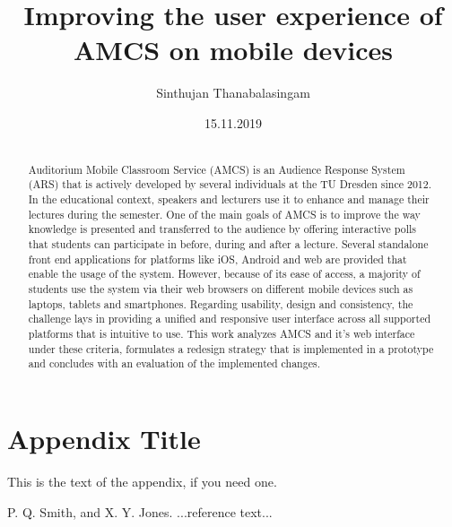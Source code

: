 \documentclass[ngerman]{tudscrreprt}
\begin{document}
	\date{15.11.2019}
	\author{Sinthujan Thanabalasingam}
	\title{Improving the user experience of AMCS on mobile devices}
	\maketitle
	
\begin{abstract}
\section*{\abstractname}
Auditorium Mobile Classroom Service (AMCS) is an Audience Response System (ARS) that is actively developed by several individuals at the TU Dresden since 2012. In the educational context, speakers and lecturers use it to enhance and manage their lectures during the semester. One of the main goals of AMCS is to improve the way knowledge is presented and transferred to the audience by offering interactive polls that students can participate in before, during and after a lecture.
Several standalone front end applications for platforms like iOS, Android and web are provided that enable the usage of the system. However, because of its ease of access, a majority of students use the system via their web browsers on different mobile devices such as laptops, tablets and smartphones. 
Regarding usability, design and consistency, the challenge lays in providing a unified and responsive user interface across all supported platforms that is intuitive to use. This work analyzes AMCS and it's web interface under these criteria, formulates a redesign strategy that is implemented in a prototype and concludes with an evaluation of the implemented changes.
	
\end{abstract}


\tableofcontents








\appendix
\section{Appendix Title}

This is the text of the appendix, if you need one.






\begin{thebibliography}{}
	
	P. Q. Smith, and X. Y. Jones. ...reference text...
	
\end{thebibliography}
\end{document}
